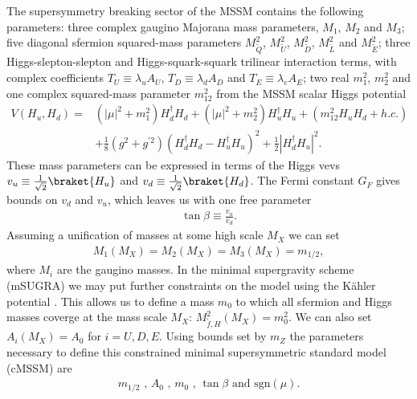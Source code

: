 \documentclass[twoside,english]{uiofysmaster}
\begin{document}
The supersymmetry breaking sector of the MSSM contains the following parameters: three complex gaugino Majorana mass parameters, $M_1$, $M_2$ and $M_3$; five diagonal sfermion squared-mass parameters $M_{\tilde{Q}}^2$, $M_{\tilde{U}}^2$, $M_{\tilde{D}}^2$, $M_{\tilde{L}}^2$ and $M_{\tilde{E}}^2$; three Higgs-slepton-slepton and Higgs-squark-squark trilinear interaction terms, with complex coefficients $T_U \equiv \lambda_u A_U$, $T_D \equiv \lambda_d A_D$ and $T_E \equiv \lambda_e A_E$; two real $m_1^2$, $m_2^2$ and one complex squared-mass parameter $m_{12}^2$ from the MSSM scalar Higgs potential \cite{Patrignani:2016xqp}
\begin{align}
V(H_u, H_d) =& (|\mu|^2 + m_1^2) H_d^{\dagger} H_d + (|\mu|^2 + m_2^2) H_u^{\dagger}H_u + (m_{12}^2 H_uH_d + h.c.)\\
&+ \frac{1}{8} (g^2 + g^{'2})(H_d^{\dagger}H_d  - H_u^{\dagger}H_u )^2+ \frac{1}{2} |H_d^{\dagger}H_u|^2.
\end{align}
These mass parameters can be expressed in terms of the Higgs vevs $v_u \equiv \frac{1}{\sqrt{2}} \braket{H_u}$ and $v_d \equiv \frac{1}{\sqrt{2}} \braket{H_d}$. The Fermi constant $G_F$ gives bounds on $v_d$ and $v_u$, which leaves us with one free parameter
\begin{align}
\tan \beta \equiv \frac{v_u}{v_d}.
\end{align}
Assuming a unification of masses at some high scale $M_X$ we can set 
\begin{align}
M_1(M_X) = M_2(M_X) = M_3(M_X) = m_{1/2},
\end{align}
where $M_i$ are the gaugino masses. In the minimal supergravity scheme (mSUGRA) we may put further constraints on the model using the K\"{a}hler potential \cite{Patrignani:2016xqp}. This allows us to define a mass $m_0$ to which all sfermion and Higgs masses coverge at the mass scale $M_X$: $M_{\tilde{f}, H}^2 (M_X) = m_0^2$. We can also set $A_i(M_X) = A_0$ for $i = U, D, E$. Using bounds set by $m_Z$ the parameters necessary to define this constrained minimal supersymmetric standard model (cMSSM) are
\begin{align}
m_{1/2} \text{ , } A_0 \text{ , } m_0 \text{ , } \tan \beta \text{ and sgn}(\mu).
\end{align}



\end{document}
